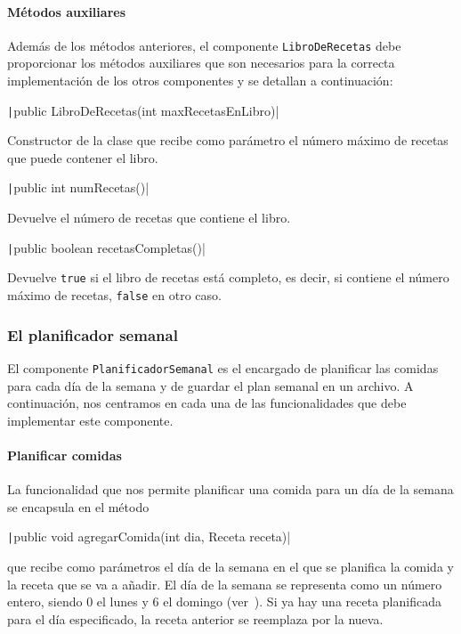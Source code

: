 \documentclass[
    a4paper, %
    12pt, %
]{CSSullivanBusinessReport}
\begin{document}
\paragraph{Métodos auxiliares}

Además de los métodos anteriores, el componente \texttt{LibroDeRecetas} debe proporcionar los métodos auxiliares que son necesarios para la correcta implementación de los otros componentes y se detallan a continuación:

\texttt|public LibroDeRecetas(int maxRecetasEnLibro)|

Constructor de la clase que recibe como parámetro el número máximo de recetas que puede contener el libro.

\texttt|public int numRecetas()|

Devuelve el número de recetas que contiene el libro.

\texttt|public boolean recetasCompletas()|

Devuelve \texttt{true} si el libro de recetas está completo, es decir, si contiene el número máximo de recetas, \texttt{false} en otro caso.

\subsubsection{El planificador semanal}

El componente \texttt{PlanificadorSemanal} es el encargado de planificar las comidas para cada día de la semana y de guardar el plan semanal en un archivo. A continuación, nos centramos en cada una de las funcionalidades que debe implementar este componente.

\paragraph{Planificar comidas}

La funcionalidad que nos permite planificar una comida para un día de la semana se encapsula en el método

\texttt|public void agregarComida(int dia, Receta receta)|

que recibe como parámetros el día de la semana en el que se planifica la comida y la receta que se va a añadir. El día de la semana se representa como un número entero, siendo 0 el lunes y 6 el domingo (ver~). Si ya hay una receta planificada para el día especificado, la receta anterior se reemplaza por la nueva.
\end{document}
